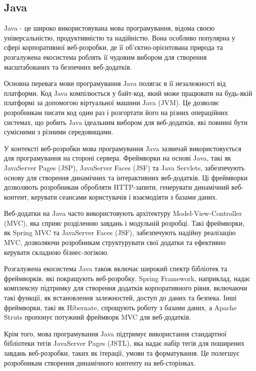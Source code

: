 \subsection{Java}
\label{subsec:java-subsection}

Java - це широко використовувана мова програмування, відома своєю універсальністю, продуктивністю та надійністю. Вона особливо популярна у сфері корпоративної веб-розробки, де її об'єктно-орієнтована природа та розгалужена екосистема роблять її чудовим вибором для створення масштабованих та безпечних веб-додатків.

Основна перевага мови програмування Java полягає в її незалежності від платформи. Код Java компілюється у байт-код, який може працювати на будь-якій платформі за допомогою віртуальної машини Java (JVM). Це дозволяє розробникам писати код один раз і розгортати його на різних операційних системах, що робить Java ідеальним вибором для веб-додатків, які повинні бути сумісними з різними середовищами.

У контексті веб-розробки мова програмування Java зазвичай використовується для програмування на стороні сервера. Фреймворки на основі Java, такі як JavaServer Pages (JSP), JavaServer Faces (JSF) та Java Servlets, забезпечують основу для створення динамічних та інтерактивних веб-додатків. Ці фреймворки дозволяють розробникам обробляти HTTP-запити, генерувати динамічний веб-контент, керувати сеансами користувачів і взаємодіяти з базами даних.

Веб-додатки на Java часто використовують архітектуру Model-View-Controller (MVC), яка сприяє розділенню завдань і модульній розробці. Такі фреймворки, як Spring MVC та JavaServer Faces (JSF), забезпечують надійну реалізацію MVC, дозволяючи розробникам структурувати свої додатки та ефективно керувати складною бізнес-логікою.

Розгалужена екосистема Java також включає широкий спектр бібліотек та фреймворків, які покращують веб-розробку. Spring Framework, наприклад, надає комплексну підтримку для створення додатків корпоративного рівня, включаючи такі функції, як встановлення залежностей, доступ до даних та безпека. Інші фреймворки, такі як Hibernate, спрощують роботу з базами даних, а Apache Struts пропонує потужний фреймворк MVC для веб-додатків.

Крім того, мова програмування Java підтримує використання стандартної бібліотеки тегів JavaServer Pages (JSTL), яка надає набір тегів для поширених завдань веб-розробки, таких як ітерації, умови та форматування. Це полегшує розробникам створення динамічного контенту на веб-сторінках.

